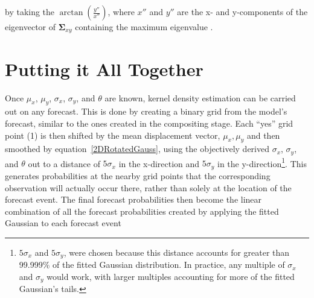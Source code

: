 \noindent by taking the $\arctan{\left(\frac{y''}{x''}\right)}$, where $x''$ and $y''$ are the x- and y-components of the eigenvector of $\boldsymbol{\Sigma}_{xy}$ containing the maximum eigenvalue \citep{Lak2010}.




\section{Putting it All Together}
\label{kde}

Once $\mu_x$, $\mu_y$, $\sigma_x$, $\sigma_y$, and $\theta$ are known, kernel density estimation can be carried out on any forecast. This is done by creating a binary grid from the model's forecast, similar to the ones created in the compositing stage.  Each ``yes'' grid point (1) is then shifted by the mean displacement vector, ${\mu_x, \mu_y}$ and then smoothed by \mbox{equation \ref{2DRotatedGauss}}, using the objectively derived $\sigma_x$, $\sigma_y$, and $\theta$ out to a distance of $5\sigma_x$ in the x-direction and $5\sigma_y$ in the y-direction\footnote{$5\sigma_x$ and $5\sigma_y$, were chosen because this distance accounts for greater than 99.999\% of the fitted Gaussian distribution. In practice, any multiple of $\sigma_x$ and $\sigma_y$ would work, with larger multiples accounting for more of the fitted Gaussian's tails.}. This generates probabilities at the nearby grid points that the corresponding observation will actually occur there, rather than solely at the location of the forecast event. The final forecast probabilities then become the linear combination of all the forecast probabilities created by applying the fitted Gaussian to each forecast event







